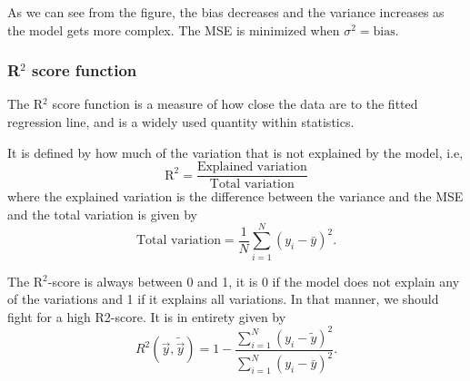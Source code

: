 As we can see from the figure, the bias decreases and the variance increases as the model gets more complex. The MSE is minimized when $\sigma^2=\text{bias}$. 

\subsubsection{R$^2$ score function} \label{sec:R2}
The R$^2$ score function is a measure of how close the data are to the fitted regression line, and is a widely used quantity within statistics. \cite{R2}

It is defined by how much of the variation that is not explained by the model, i.e, 
\begin{equation*}
\text{R}^2=\frac{\text{Explained variation}}{\text{Total variation}}
\end{equation*}
where the explained variation is the difference between the variance and the MSE and the total variation is given by
\begin{equation*}
\text{Total variation}=\frac{1}{N}\sum_{i=1}^N(y_i-\bar{y})^2.
\end{equation*}

The R$^2$-score is always between 0 and 1, it is 0 if the model does not explain any of the variations and 1 if it explains all variations. In that manner, we should fight for a high R2-score. It is in entirety given by
\begin{equation}
R^2(\vec{y},\tilde{\vec{y}})=1-\frac{\sum_{i=1}^N(y_i-\tilde{y})^2}{\sum_{i=1}^N(y_i-\bar{y})^2}.
\end{equation}